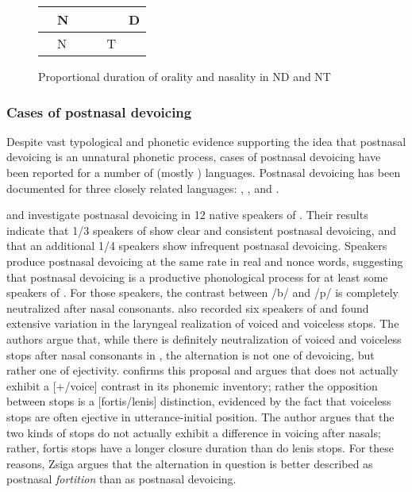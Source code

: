 \documentclass[output=paper,hidelinks]{langscibook}
\begin{document}
\begin{figure}
\caption{Proportional duration of orality and nasality in ND and NT}
\label{NDinternaltiming}
\begin{tabular}{|llllll|}
\hline
 & N &                       &  & \multicolumn{1}{l|}{} & D \\ \hline
 & N & \multicolumn{1}{l|}{} &  & T                     &   \\ \hline
\end{tabular}
\end{figure}

\subsubsection{Cases of postnasal devoicing}

Despite vast typological and phonetic evidence supporting the idea that postnasal devoicing is an unnatural phonetic process, cases of postnasal devoicing have been reported for a number of (mostly ) languages. Postnasal devoicing has been documented for three closely related languages:  \citep{Sole2010},  \citep{Hyman2001, Coetzee2007, CoetzeePretorius2010, Gouskova2011, BoyerZsiga2013}, and  \citep{BoyerZsiga2013}.

\citet{Coetzee2007} and \citet{CoetzeePretorius2010} investigate postnasal devoicing in 12 native speakers of . Their results indicate that 1/3 speakers of  show clear and consistent postnasal devoicing, and that an additional 1/4 speakers show infrequent postnasal devoicing. Speakers produce postnasal devoicing at the same rate in real and nonce words, suggesting that postnasal devoicing is a productive phonological process for at least some speakers of . For those speakers, the contrast between /b/ and /p/ is completely neutralized after nasal consonants. \citet{Gouskova2011} also recorded six speakers of  and found extensive variation in the laryngeal realization of voiced and voiceless stops. The authors argue that, while there is definitely neutralization of voiced and voiceless stops after nasal consonants in , the alternation is not one of devoicing, but rather one of ejectivity. \citet{Zsiga2018} confirms this proposal and argues that  does not actually exhibit a [+/\textminus{}voice] contrast in its phonemic inventory; rather the opposition between stops is a [fortis/lenis] distinction, evidenced by the fact that voiceless stops are often ejective in utterance-initial position. The author argues that the two kinds of stops do not actually exhibit a difference in voicing after nasals; rather, fortis stops have a longer closure duration than do lenis stops. For these reasons, Zsiga argues that the alternation in question is better described as postnasal \textit{fortition} than as postnasal devoicing.
\end{document}
